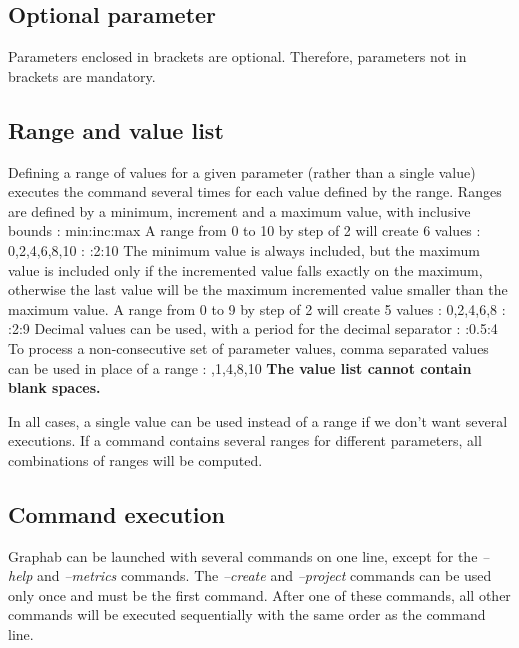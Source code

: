\documentclass[a4paper,10pt]{report}
\newenvironment{cmd}
{\quote\Verbatim}
{\endVerbatim\endquote}
\begin{document}
\subsection{Optional parameter}
Parameters enclosed in brackets are optional. 
Therefore, parameters not in brackets are mandatory.
\subsection{Range and value list}
Defining a range of values for a given parameter (rather than a single value) executes the command several times for each value defined by the range.
Ranges are defined by a minimum, increment and a maximum value, with inclusive bounds :
\begin{cmd}
min:inc:max
\end{cmd}
A range from 0 to 10 by step of 2 will create 6 values : 0,2,4,6,8,10 :
\begin{cmd}
0:2:10
\end{cmd}
The minimum value is always included, but the maximum value is included only if the incremented value falls exactly on the maximum, 
otherwise the last value will be the maximum incremented value smaller than the maximum value.
A range from 0 to 9 by step of 2 will create 5 values : 0,2,4,6,8 :
\begin{cmd}
0:2:9
\end{cmd}
Decimal values can be used, with a period for the decimal separator : 
\begin{cmd}
1.5:0.5:4
\end{cmd}
To process a non-consecutive set of parameter values, comma separated values can be used in place of a range :
\begin{cmd}
0,1,4,8,10
\end{cmd}
\textbf{The value list cannot contain blank spaces.}

In all cases, a single value can be used instead of a range if we don't want several executions.
If a command contains several ranges for different parameters, all combinations of ranges will be computed.

\subsection{Command execution}
Graphab can be launched with several commands on one line, except for the \textit{--help} and \textit{--metrics} commands.
The \textit{--create} and \textit{--project} commands can be used only once and must be the first command. 
After one of these commands, all other commands will be executed sequentially with the same order as the command line.
\end{document}
